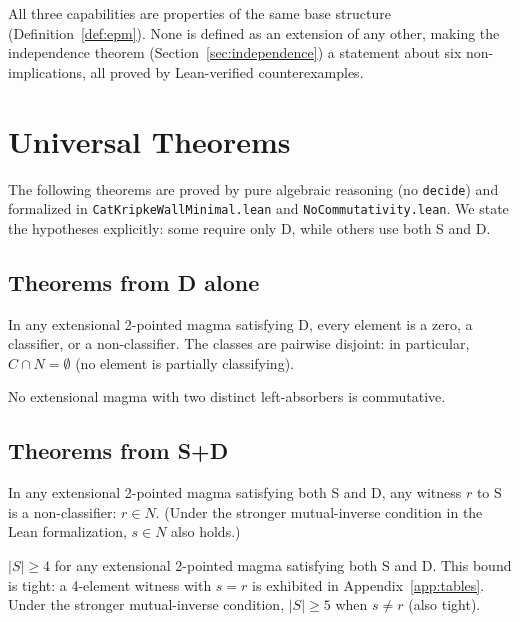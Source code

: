 \documentclass[sigconf,screen,review,anonymous]{acmart}
\begin{document}
All three capabilities are properties of the same base structure (Definition~\ref{def:epm}). None is defined as an extension of any other, making the independence theorem (Section~\ref{sec:independence}) a statement about six non-implications, all proved by Lean-verified counterexamples.

\section{Universal Theorems}
\label{sec:universal}

The following theorems are proved by pure algebraic reasoning (no \texttt{decide}) and formalized in \texttt{CatKripkeWallMinimal.lean} and \texttt{NoCommutativity.lean}. We state the hypotheses explicitly: some require only D, while others use both S and D.

\subsection{Theorems from D alone}

\begin{theorem}
\label{thm:three-cat}
In any extensional 2-pointed magma satisfying D, every element is a zero, a classifier, or a non-classifier. The classes are pairwise disjoint: in particular, $C \cap N = \emptyset$ (no element is partially classifying).
\end{theorem}

\begin{theorem}[Asymmetry]
\label{thm:asymmetry}
No extensional magma with two distinct left-absorbers is commutative.
\end{theorem}

\subsection{Theorems from S+D}

\begin{theorem}
\label{thm:placement}
In any extensional 2-pointed magma satisfying both S and D, any witness $r$ to S is a non-classifier: $r \in N$. (Under the stronger mutual-inverse condition in the Lean formalization, $s \in N$ also holds.)
\end{theorem}

\begin{theorem}
\label{thm:card}
$|S| \geq 4$ for any extensional 2-pointed magma satisfying both S and D. This bound is tight: a 4-element witness with $s = r$ is exhibited in Appendix~\ref{app:tables}. Under the stronger mutual-inverse condition, $|S| \geq 5$ when $s \neq r$ (also tight).
\end{theorem}
\end{document}
